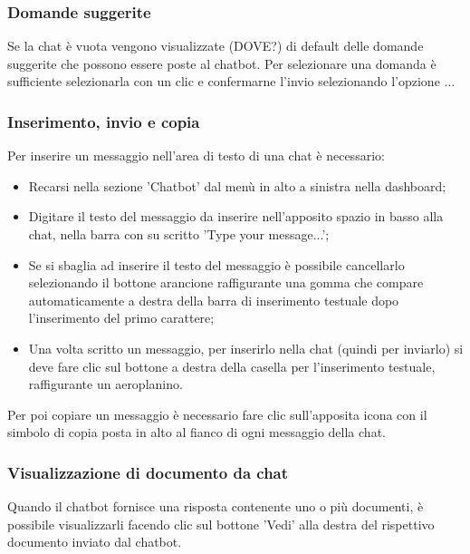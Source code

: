 \documentclass[10pt, a4paper]{article}
\begin{document}
\subsubsection{Domande suggerite}
Se la chat è vuota vengono visualizzate (DOVE?) di default delle domande suggerite che possono essere poste al chatbot. Per selezionare una domanda è sufficiente selezionarla con un clic e confermarne l'invio selezionando l'opzione ...
\subsubsection{Inserimento, invio e copia}
Per inserire un messaggio nell'area di testo di una chat è necessario:
\begin{itemize}
    \item Recarsi nella sezione 'Chatbot' dal menù in alto a sinistra nella dashboard;
    \item Digitare il testo del messaggio da inserire nell'apposito spazio in basso alla chat, nella barra con su scritto 'Type your message...';
    \item Se si sbaglia ad inserire il testo del messaggio è possibile cancellarlo selezionando il bottone arancione raffigurante una gomma che compare automaticamente a destra della barra di inserimento testuale dopo l'inserimento del primo carattere;
    \item Una volta scritto un messaggio, per inserirlo nella chat (quindi per inviarlo) si deve fare clic sul bottone a destra della casella per l'inserimento testuale, raffigurante un aeroplanino.
\end{itemize}
Per poi copiare un messaggio è necessario fare clic sull'apposita icona con il simbolo di copia posta in alto al fianco di ogni messaggio della chat.
\subsubsection{Visualizzazione di documento da chat}
Quando il chatbot fornisce una risposta contenente uno o più documenti, è possibile visualizzarli facendo clic sul bottone 'Vedi' alla destra del rispettivo documento inviato dal chatbot.
\end{document}
